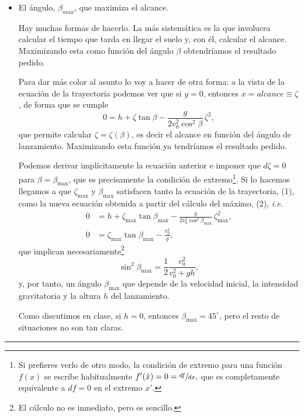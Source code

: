 \documentclass[a4paper,14pt]{extarticle}
\newcommand{\halmos}{
\vspace*{-4ex}

\begin{flushright}
\rule{1mm}{2.5mm} \end{flushright}
\vspace*{-3.5ex}

}
\renewcommand{\qed}{\halmos}
\begin{document}
\begin{enumerate}
\begin{itemize}
    		\item[b)] El ángulo, $\beta_{max}$, que maximiza el alcance. 
    		\begin{mdframed}[backgroundcolor=yellow!20]  
    		Hay muchas formas de hacerlo. La más sistemática es la que involucra calcular el tiempo que tarda en llegar el suelo y, con él, calcular el alcance. Maximizando esta como función del ángulo $\beta$ obtendríamos el resultado pedido.
    		
    		Para dar más color al asunto lo voy a hacer de otra forma: a la vista de la ecuación de la trayectoria podemos ver que si $y=0$, entonces $x=alcance\equiv \zeta$, de forma que se cumple
    		\[0=h+\zeta\tan\beta-\frac{g}{2v_0^2\cos^2\beta}\,\zeta^2,\]
    		que permite calcular $\zeta=\zeta(\beta)$, es decir el alcance en función del ángulo de lanzamiento. Maximizando esta función ya tendríamos el resultado pedido.
    		
    		Podemos derivar implícitamente la ecuación anterior e imponer que $d\zeta=0$ para $\beta=\beta_{\max}$, que es precisamente la condición de extremo\footnote{Si prefieres verlo de otro modo, la condición de extremo para una función $f(x)$ se escribe habitualmente $f'(\hat x)=0=\sfrac{df}{dx},$ que es completamente equivalente a $df=0$ en el extremo $x'$.}. Si lo hacemos llegamos a que $\zeta_{\max}$ y $\beta_{\max}$ satisfacen tanto la ecuación de la trayectoria, (1),  como la nueva ecuación obtenida a partir del cálculo del máximo, (2), \textit{i.e.}
    		\begin{align}
    		0&=h+\zeta_{\max}\tan\beta_{\max}-\frac{g}{2v_0^2\cos^2\beta_{\max}}\,\zeta_{\max}^2,\\
    		0&=\zeta_{\max}\tan\beta_{\max}-\frac{v_0^2}{g},
    		\end{align}
    		que implican necesariamente\footnote{El cálculo no es inmediato, pero es sencillo.}
    		\[\sin^2\beta_{\max}=\frac{1}{2}\frac{v_0^2}{v_0^2+gh},\]
    		y, por tanto, un ángulo $\beta_{\max}$ que depende de la velocidad inicial, la intensidad gravitatoria y la altura $h$ del lanzamiento. 
    		
    		Como discutimos en clase, si $h=0$, entonces $\beta_{\max}=45^\circ$, pero el resto de situaciones no son tan claras.
    		\end{mdframed}
		\end{itemize}    	 
    \qed
    

\end{enumerate}
\end{document}
